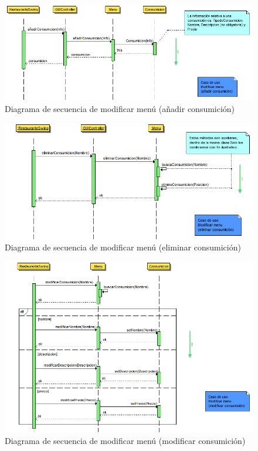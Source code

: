 \documentclass[spanish,a4paper,11pt, twoside]{report}	%
\begin{document}
		\begin{figure}[!h]
		\centering
		\includegraphics[scale=0.6]{DSanyadirconsumicion.png}
		\caption{Diagrama de secuencia de modificar menú (añadir consumición)}
		\end{figure}
\clearpage
		\begin{figure}[!h]
		\centering
		\includegraphics[scale=0.55]{DSeliminarconsumicion.png}
		\caption{Diagrama de secuencia de modificar menú (eliminar consumición)}
		\end{figure}

		\begin{figure}[!h]
		\centering
		\includegraphics[scale=0.55]{DSmodificarconsumicion.png}
		\caption{Diagrama de secuencia de modificar menú (modificar consumición)}
		\end{figure}
\end{document}
